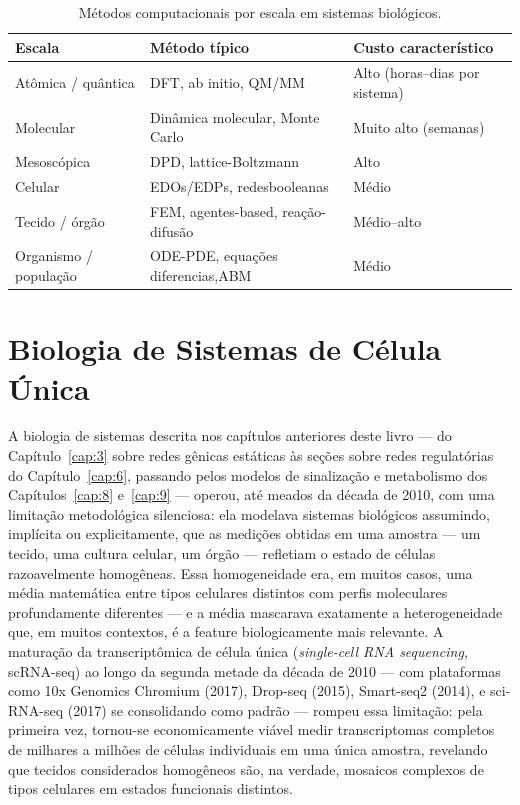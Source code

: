 \begin{table}[h]
\centering
\caption{Métodos computacionais por escala em sistemas biológicos.}
\label{tab:15-escalas}
\begin{tabular}{lll}
\hline
\textbf{Escala} & \textbf{Método típico} & \textbf{Custo característico} \\ \hline
Atômica / quântica & DFT, ab initio, QM/MM          & Alto (horas--dias por sistema) \\
Molecular          & Dinâmica molecular, Monte Carlo & Muito alto (semanas) \\
Mesoscópica        & DPD, lattice-Boltzmann         & Alto \\
Celular            & EDOs/EDPs, redesbooleanas      & Médio \\
Tecido / órgão     & FEM, agentes-based, reação-difusão & Médio--alto \\
Organismo / população & ODE-PDE, equações diferencias,ABM & Médio \\
\hline
\end{tabular}
\end{table}



\section{Biologia de Sistemas de Célula Única}
\label{sec:15-celulaunica}

A biologia de sistemas descrita nos capítulos anteriores deste livro --- do Capítulo~\ref{cap:3} sobre redes gênicas estáticas às seções sobre redes regulatórias do Capítulo~\ref{cap:6}, passando pelos modelos de sinalização e metabolismo dos Capítulos~\ref{cap:8} e~\ref{cap:9} --- operou, até meados da década de 2010, com uma limitação metodológica silenciosa: ela modelava sistemas biológicos assumindo, implícita ou explicitamente, que as medições obtidas em uma amostra --- um tecido, uma cultura celular, um órgão --- refletiam o estado de células razoavelmente homogêneas. Essa homogeneidade era, em muitos casos, uma média matemática entre tipos celulares distintos com perfis moleculares profundamente diferentes --- e a média mascarava exatamente a heterogeneidade que, em muitos contextos, é a feature biologicamente mais relevante. A maturação da transcriptômica de célula única (\emph{single-cell RNA sequencing}, scRNA-seq) ao longo da segunda metade da década de 2010 --- com plataformas como 10x Genomics Chromium (2017), Drop-seq (2015), Smart-seq2 (2014), e sci-RNA-seq (2017) se consolidando como padrão --- rompeu essa limitação: pela primeira vez, tornou-se economicamente viável medir transcriptomas completos de milhares a milhões de células individuais em uma única amostra, revelando que tecidos considerados homogêneos são, na verdade, mosaicos complexos de tipos celulares em estados funcionais distintos.

